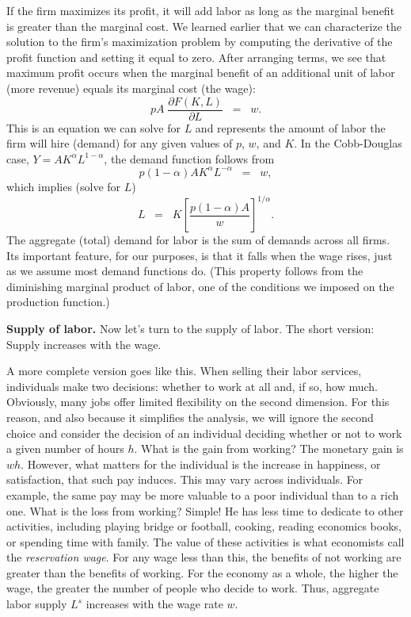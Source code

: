 If the firm maximizes its profit, it will add labor as
long as the marginal benefit is greater than the marginal cost. 
We learned earlier that we can characterize the solution
to the firm's maximization problem by computing the derivative
of the profit function and setting it equal to zero.
After arranging terms, we see that maximum profit occurs
when the marginal benefit of an additional unit of labor (more revenue)
equals its marginal cost (the wage):
\[
    p A \; \frac{\partial F(K,L)}{\partial L} \;\;=\;\; w .
\]
%
This is an equation we can solve for $L$ and represents the amount
of labor the firm will hire (demand) for any given values of $p$,
$w$, and $K$.  In the Cobb-Douglas   case,
$ Y = A K^\alpha L^{1-\alpha}$,
the demand function follows from
%
\begin{equation*}
    p (1-\alpha) A K^{\alpha}L^{-\alpha} \;\;=\;\; w ,
\end{equation*}
%
which implies (solve for $L$)
%
\begin{equation}
    L \;\;=\;\; K\left[\frac{ p (1-\alpha) A}{w}\right]^{{1}/{\alpha}}.
    \label{eq:ld}
\end{equation}
%
The aggregate (total) demand for labor is the sum of demands
across all firms. Its important feature, for our purposes, is that
it falls when the wage rises, just as we assume most demand
functions do.
(This property follows from the diminishing  marginal product of labor,
   one of the conditions we imposed on the
production function.)

\textbf{Supply of labor.}
Now let's turn to the supply of labor. The short version: Supply
increases with the wage.

A more complete version goes like this.
When selling their labor services, individuals
make two decisions: whether to work at all and, if so, how much.
Obviously, many jobs offer limited flexibility on the
second dimension.  For this reason, and also because it simplifies
the analysis, we will ignore the second choice and consider the
decision of an individual deciding whether or not to work a given
number of hours $h$.  What is the gain from working? The monetary
gain is $wh$. However, what matters for the individual is the
increase in happiness, or satisfaction, that such pay induces.
This may vary across individuals.  For example, the same pay may
be more valuable to a poor individual than to a rich one. What is
the loss from working? Simple!  He has less time to dedicate to
other activities, including playing bridge or football, cooking,
reading economics books, or spending time with family.
The value of these
activities is what economists call the \textit{reservation wage}.
For any wage less than this, the benefits of not working are
greater than the benefits of working. For the economy as a whole,
the higher the wage, the greater the number of people
who decide to work.
Thus, aggregate labor supply $L^{s}$ increases with the wage rate
$w$.


